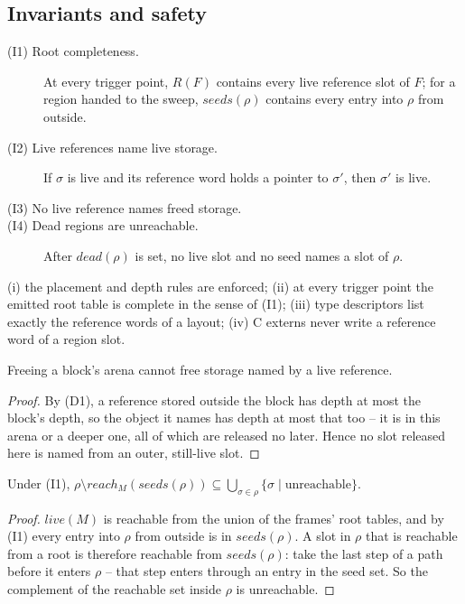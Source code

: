 \subsection{Invariants and safety}
\label{sec:thm-safe}

\begin{description}
\item[(I1) Root completeness.] At every trigger point, $R(F)$ contains every live reference slot of
  $F$; for a region handed to the sweep, $\mathit{seeds}(\rho)$ contains every entry into $\rho$ from
  outside.
\item[(I2) Live references name live storage.] If $\sigma$ is live and its reference word holds a
  pointer to $\sigma'$, then $\sigma'$ is live.
\item[(I3) No live reference names freed storage.]
\item[(I4) Dead regions are unreachable.] After $\mathit{dead}(\rho)$ is set, no live slot and no
  seed names a slot of $\rho$.
\end{description}

\begin{assumption}
\label{as:sound}
(i) the placement and depth rules are enforced; (ii) at every trigger point the emitted root table
is complete in the sense of (I1); (iii) type descriptors list exactly the reference words of a layout;
(iv) C externs never write a reference word of a region slot.
\end{assumption}

\begin{lemma}
\label{lem:local}
Freeing a block's arena cannot free storage named by a live reference.
\end{lemma}
\begin{proof}
By (D1), a reference stored outside the block has depth at most the block's depth, so the object it
names has depth at most that too -- it is in this arena or a deeper one, all of which are released no
later. Hence no slot released here is named from an outer, still-live slot.
\end{proof}

\begin{lemma}
\label{lem:sweep}
Under (I1), $\rho \setminus \mathit{reach}_M(\mathit{seeds}(\rho)) \subseteq
\bigcup_{\sigma \in \rho} \{\sigma \mid \text{unreachable}\}$.
\end{lemma}
\begin{proof}
$\mathit{live}(M)$ is reachable from the union of the frames' root tables, and by (I1) every entry into
$\rho$ from outside is in $\mathit{seeds}(\rho)$. A slot in $\rho$ that is reachable from a root is
therefore reachable from $\mathit{seeds}(\rho)$: take the last step of a path before it enters $\rho$
-- that step enters through an entry in the seed set. So the complement of the reachable set inside
$\rho$ is unreachable.
\end{proof}

